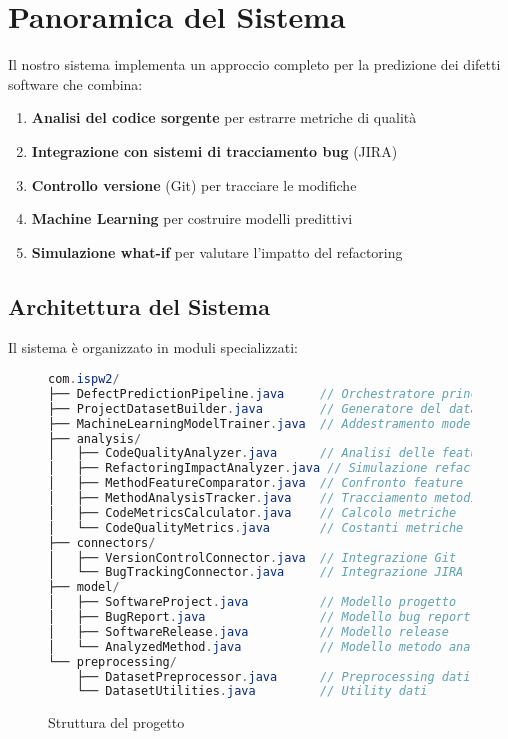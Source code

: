 \documentclass[12pt,a4paper]{article}
\begin{document}
\section{Panoramica del Sistema}

Il nostro sistema implementa un approccio completo per la predizione dei difetti software che combina:

\begin{enumerate}
    \item \textbf{Analisi del codice sorgente} per estrarre metriche di qualità
    \item \textbf{Integrazione con sistemi di tracciamento bug} (JIRA)
    \item \textbf{Controllo versione} (Git) per tracciare le modifiche
    \item \textbf{Machine Learning} per costruire modelli predittivi
    \item \textbf{Simulazione what-if} per valutare l'impatto del refactoring
\end{enumerate}

\subsection{Architettura del Sistema}

Il sistema è organizzato in moduli specializzati:

\begin{figure}[H]
\centering
\begin{lstlisting}[language=Java, basicstyle=\ttfamily\small]
com.ispw2/
├── DefectPredictionPipeline.java     // Orchestratore principale
├── ProjectDatasetBuilder.java        // Generatore del dataset
├── MachineLearningModelTrainer.java  // Addestramento modelli ML
├── analysis/
│   ├── CodeQualityAnalyzer.java      // Analisi delle feature
│   ├── RefactoringImpactAnalyzer.java // Simulazione refactoring
│   ├── MethodFeatureComparator.java  // Confronto feature
│   ├── MethodAnalysisTracker.java    // Tracciamento metodi
│   ├── CodeMetricsCalculator.java    // Calcolo metriche
│   └── CodeQualityMetrics.java       // Costanti metriche
├── connectors/
│   ├── VersionControlConnector.java  // Integrazione Git
│   └── BugTrackingConnector.java     // Integrazione JIRA
├── model/
│   ├── SoftwareProject.java          // Modello progetto
│   ├── BugReport.java                // Modello bug report
│   ├── SoftwareRelease.java          // Modello release
│   └── AnalyzedMethod.java           // Modello metodo analizzato
└── preprocessing/
    ├── DatasetPreprocessor.java      // Preprocessing dati
    └── DatasetUtilities.java         // Utility dati
\end{lstlisting}
\caption{Struttura del progetto}
\end{figure}
\end{document}
